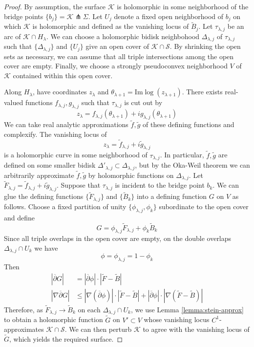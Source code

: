 \documentclass[11pt]{amsart}
\theoremstyle{definition}
\theoremstyle{remark}
\numberwithin{equation}{section}
\newcommand{\dbar}{\overline{\del}}
\newcommand{\cK}{\mathcal{K}}
\newcommand{\cS}{\mathcal{S}}
\newcommand{\del}{\partial}
\begin{document}
\begin{proof}
    By assumption, the surface $\cK$ is holomorphic in some neighborhood of the bridge points $\{b_j\} = \cK \pitchfork \Sigma$.  Let $U_j$ denote a fixed open neighborhood of $b_j$ on which $\cK$ is holomorphic and defined as the vanishing locus of $\widetilde{B}_j$.  Let $\tau_{\lambda,j}$ be an arc of $\cK \cap H_{\lambda}$.  We can choose a holomorphic bidisk neighbohood $\Delta_{\lambda,j}$ of $\tau_{\lambda,j}$ such that $\{\Delta_{\lambda,j}\}$ and $\{U_j\}$ give an open cover of $\cK \cap \cS$.  By shrinking the open sets as necessary, we can assume that all triple intersections among the open cover are empty.  Finally, we choose a strongly pseudoconvex neighborhood $V$ of $\cK$ contained within this open cover.

    Along $H_{\lambda}$, have coordinates $z_{\lambda}$ and $\theta_{\lambda+1} = \text{Im} \log(z_{\lambda+1})$.  There exists real-valued functions $f_{\lambda,j},g_{\lambda,j}$ such that $\tau_{\lambda,j}$ is cut out by
    \[z_{\lambda} = f_{\lambda,j}(\theta_{\lambda+1}) + i g_{\lambda,j}(\theta_{\lambda+1})\]
    We can take real analytic approximations $\widetilde{f},\widetilde{g}$ of these defining functions and complexify.  The vanishing locus of 
    \[z_{\lambda} = \widetilde{f}_{\lambda,j} + i \widetilde{g}_{\lambda,j}\]
    is a holomorphic curve in some neighborhood of $\tau_{\lambda,j}$.  In particular, $\widetilde{f},\widetilde{g}$ are defined on some smaller bidisk $\Delta'_{\lambda,j} \subset \Delta_{\lambda,j}$, but by the Oka-Weil theorem we can arbitrarily approximate $\widetilde{f},\widetilde{g}$ by holomorphic functions on $\Delta_{\lambda,j}$.  Let $\widetilde{F}_{\lambda,j} = \widetilde{f}_{\lambda,j} + i \widetilde{g}_{\lambda,j}$.  Suppose that $\tau_{\lambda,j}$ is incident to the bridge point $b_k$.  We can glue the defining functions $\{\widetilde{F}_{\lambda,j}\}$ and $\{\widetilde{B}_k\}$ into a defining function $G$ on $V$ as follows.  Choose a fixed partition of unity $\{\phi_{\lambda,j},\phi_k\}$ subordinate to the open cover and define
    \[G = \phi_{\lambda,j}\widetilde{F}_{\lambda,j} + \phi_{k} \widetilde{B}_k\]
    Since all triple overlaps in the open cover are empty, on the double overlaps $\Delta_{\lambda,j} \cap U_k$ we have
    \[\phi = \phi_{\lambda,j} = 1 - \phi_k \]
    Then
    \begin{align*}
        |\dbar G| &= |\dbar \phi| \cdot |\widetilde{F} - \widetilde{B}| \\
        |\nabla \dbar G| &\leq |\nabla (\dbar \phi)| \cdot |\widetilde{F} - \widetilde{B}| + |\dbar \phi| \cdot |\nabla (\widetilde{F} - \widetilde{B})|
    \end{align*}
    Therefore, as $\widetilde{F}_{\lambda,j} \rightarrow \widetilde{B}_k$ on each $\Delta_{\lambda,j} \cap U_k$, we use Lemma \ref{lemma:stein-approx} to obtain a holomorphic function $\widetilde{G}$ on $V' \subset V$ whose vanishing locus $C^1$-approximates $\cK \cap \cS$.  We can then perturb $\cK$ to agree with the vanishing locus of $\widetilde{G}$, which yields the required surface.
\end{proof}
\end{document}
